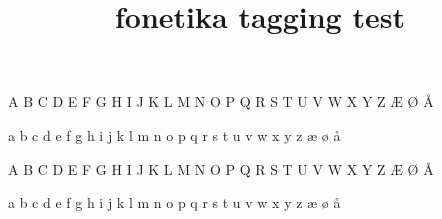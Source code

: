 \documentclass{article}
\title{fonetika tagging test}
\begin{document}
\fonetikaseriffamily
A B C D E F G H I J K L M N O P Q R S T U V W X Y Z Æ Ø Å

a b c d e f g h i j k l m n o p q r s t u v w x y z æ ø å

\fonetikasansfamily 
A B C D E F G H I J K L M N O P Q R S T U V W X Y Z Æ Ø Å

a b c d e f g h i j k l m n o p q r s t u v w x y z æ ø å
\end{document}
